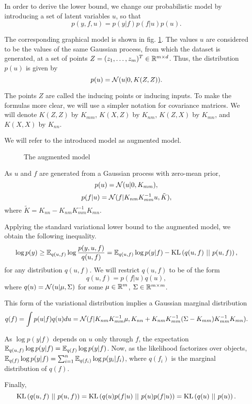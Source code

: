 In order to derive the lower bound, we change our probabilistic model by introducing a set of latent variables $u$, so that
$$p(y, f, u) = p(y | f) p(f | u) p(u).$$

The corresponding graphical model is shown in fig. \ref{inducing_inputs_gm}. The values $u$ are considered to be the values of the same Gaussian process, from which the dataset is generated, at a set of points $Z = (z_1, \ldots, z_m)^T \in \mathbb{R}^{m \times d}$. Thus, the distribution $p(u)$ is given by 
$$p(u) = \mathcal{N}(u|0, K(Z, Z)).$$

The points $Z$ are called the inducing points or inducing inputs. To make the formulas more clear, we will use a simpler notation for covariance matrices. We will denote $K(Z, Z)$ by $K_{mm}$, $K(X, Z)$ by $K_{nm}$, $K(Z, X)$ by $K_{mn}$, and $K(X, X)$ by $K_{nn}$.

We will refer to the introduced model as augmented model. 

\begin{figure}[!h]
	\centering
	\scalebox{0.9}{
		
	}
	\caption{The augmented model}
	\label{inducing_inputs_gm}
\end{figure}

As $u$ and $f$ are generated from a Gaussian process with zero-mean prior, 
$$p(u) = \mathcal{N}(u|0, K_{mm}),$$
$$p(f|u) = \mathcal{N} (f|K_{nm} K_{mm}^{-1}u, \tilde K),$$
where $\tilde K = K_{nn} - K_{nm} K_{mm}^{-1} K_{mn}.$

Applying the standard variational lower bound to the augmented model, we obtain the following inequality.
$$\log p(y) \ge \mathbb{E}_{q(u, f)} \log \frac {p(y, u, f)}{q(u, f)} = \mathbb{E}_{q(u, f)}\log p(y | f) - \mbox{KL}\left(q(u, f)\mbox{ || }p(u, f)\right),$$
for any distribution $q(u, f)$. We will restrict $q(u, f)$ to be of the form
$$q(u, f) = p(f | u) q(u),$$
where $q(u) = \mathcal{N}(u | \mu, \Sigma)$ for some $\mu \in \mathbb{R}^m$, $\Sigma \in \mathbb{R}^{m \times m}$.

This form of the variational distribution implies a Gaussian marginal distribution
$$q(f) = \int p(u | f) q(u) du = \mathcal{N}(f| K_{nm} K_{mm}^{-1} \mu, K_{nn} + K_{nm} K_{mm}^{-1}(\Sigma - K_{mm}) K_{mm}^{-1} K_{mn}).$$

As $\log p(y|f)$ depends on $u$ only through $f$, the expectation $\mathbb{E}_{q(u, f)}\log p(y | f) = \mathbb{E}_{q(f)}\log p(y | f)$. Now, as the likelihood factorizes over objects, $\mathbb{E}_{q(f)}\log p(y | f) = \sum_{i = 1}^{n} \mathbb{E}_{q(f_i)}\log p(y_i | f_i)$, where $q(f_i)$ is the marginal distribution of $q(f)$.

Finally, 
$$\mbox{KL}\left(q(u, f)\mbox{ || }p(u, f)\right) = \mbox{KL}\left(q(u) p(f | u)\mbox{ || }p(u) p(f | u)\right) = \mbox{KL}\left(q(u)\mbox{ || }p(u)\right).$$

